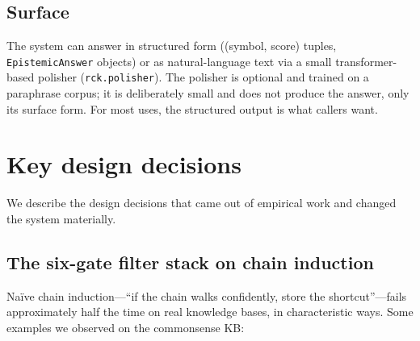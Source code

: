 \documentclass[11pt]{article}
\begin{document}
\subsection{Surface}

The system can answer in structured form ((symbol, score) tuples,
\texttt{EpistemicAnswer} objects) or as natural-language text via a
small transformer-based polisher (\texttt{rck.polisher}). The
polisher is optional and trained on a paraphrase corpus; it is
deliberately small and does not produce the answer, only its surface
form. For most uses, the structured output is what callers want.

\section{Key design decisions}
\label{sec:filter-stack}

We describe the design decisions that came out of empirical work
and changed the system materially.

\subsection{The six-gate filter stack on chain induction}
\label{sec:fourgate}

Na\"{i}ve chain induction---``if the chain walks confidently, store
the shortcut''---fails approximately half the time on real
knowledge bases, in characteristic ways. Some examples we observed
on the commonsense KB:
\end{document}
